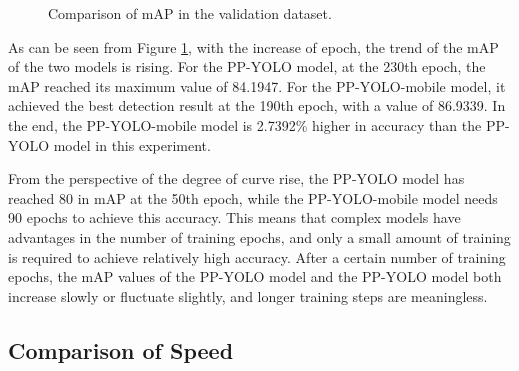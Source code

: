 \documentclass[sensors,article,submit,moreauthors,pdftex]{Definitions/mdpi}
\begin{document}
\begin{figure}[htbp]
\centering
{}
\quad
{}
\caption{Comparison of mAP in the validation dataset.}
\label{fig:map}
\end{figure}

As can be seen from Figure \ref{fig:map}, with the increase of epoch, the trend of the mAP of the two models is rising. For the PP-YOLO model, at the 230th epoch, the mAP reached its maximum value of 84.1947. For the PP-YOLO-mobile model, it achieved the best detection result at the 190th epoch, with a value of 86.9339. In the end, the PP-YOLO-mobile model is 2.7392\% higher in accuracy than the PP-YOLO model in this experiment.



From the perspective of the degree of curve rise, the PP-YOLO model has reached 80 in mAP at the 50th epoch, while the PP-YOLO-mobile model needs 90 epochs to achieve this accuracy. This means that complex models have advantages in the number of training epochs, and only a small amount of training is required to achieve relatively high accuracy. After a certain number of training epochs, the mAP values of the PP-YOLO model and the PP-YOLO model both increase slowly or fluctuate slightly, and longer training steps are meaningless.



\subsection{Comparison of Speed}
\end{document}
